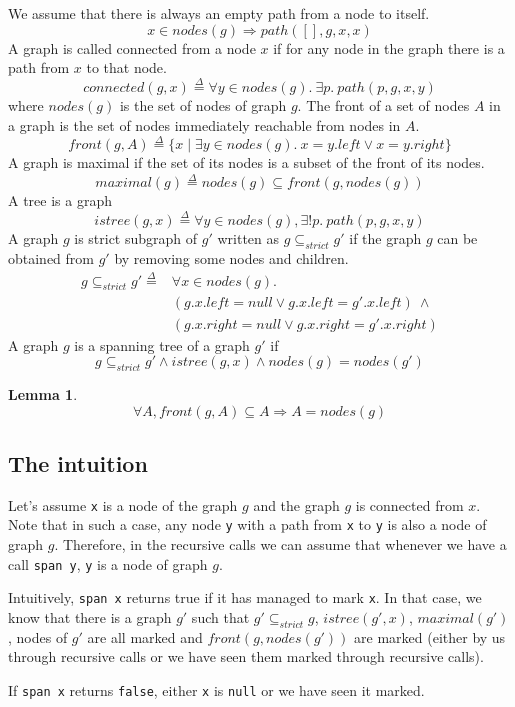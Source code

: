 \documentclass[nocopyrightspace]{sigplanconf}
\newtheorem{lemma}{Lemma}
\def\MyMLe{\lstinline[language=MyML, basicstyle=\small\ttfamily]}
\newcommand{\defeq}{\overset{\Delta}{=}}
\newcommand{\path}{\mathit{path}}
\newcommand{\connected}{\mathit{connected}}
\newcommand{\nodes}{\mathit{nodes}}
\newcommand{\front}{\mathit{front}}
\newcommand{\maximal}{\mathit{maximal}}
\newcommand{\Left}{\mathit{left}}
\newcommand{\Right}{\mathit{right}}
\newcommand{\istree}{\mathit{istree}}
\newcommand{\Null}{\mathit{null}}
\newcommand{\strictSG}{\subseteq_{\mathit{strict}}}
\begin{document}
We assume that there is always an empty path from a node to itself.
\[
x \in \nodes(g) \Rightarrow \path([], g, x, x)
\]
A graph is called connected from a node $x$ if for any node in the graph there is a path from $x$ to that node.
\[
\connected(g, x) \defeq \forall y \in \nodes(g).~ \exists p.~\path(p, g, x, y)
\]
where $\nodes(g)$ is the set of nodes of graph $g$.
The front of a set of nodes $A$ in a graph is the set of nodes immediately reachable from nodes in $A$.
\[
\front(g, A) \defeq \{x \mid \exists y \in \nodes(g).~x = y.\Left \lor x = y.\Right \}
\]
A graph is maximal if the set of its nodes is a subset of the front of its nodes.
\[
\maximal(g) \defeq \nodes(g) \subseteq \front(g, \nodes(g))
\]
A tree is a graph
\[
\istree(g, x) \defeq \forall y \in \nodes(g), \exists! p.~\path(p, g, x, y)
\]
A graph $g$ is strict subgraph of $g'$ written as $g \strictSG g'$
if the graph $g$ can be obtained from $g'$ by removing some nodes and children.
\[
\begin{array}{ll}
g \strictSG g' \defeq & \forall x \in \nodes(g).\\
& (g.x.\Left = \Null \lor g.x.\Left = g'.x.\Left)~\land \\
& (g.x.\Right = \Null \lor g.x.\Right = g'.x.\Right)
\end{array}
\]
A graph $g$ is a spanning tree of a graph $g'$ if
\[
g \strictSG g' \land \istree(g, x) \land \nodes(g) = \nodes(g')
\]
\begin{lemma}\label{lem:in_front_nodes}
\[
\forall A, \front(g, A) \subseteq A \Rightarrow A = \nodes(g)
\]
\end{lemma}
\subsection{The intuition}
Let's assume \MyMLe{x} is a node of the graph $g$ and the graph $g$ is connected from $x$.
Note that in such a case, any node \MyMLe{y} with a path from \MyMLe{x} to \MyMLe{y} is also a node of graph $g$.
Therefore, in the recursive calls we can assume that whenever we have a call \MyMLe{span y}, \MyMLe{y} is a node of graph $g$.

Intuitively, \MyMLe{span x} returns true if it has managed to mark \MyMLe{x}.
In that case, we know that there is a graph $g'$ such that
$g' \strictSG g$, $\istree(g', x)$, $\maximal(g')$, nodes of $g'$ are all marked and $\front(g, \nodes(g'))$ are marked (either by us through recursive calls or we have seen them marked through recursive calls).

If \MyMLe{span x} returns \MyMLe{false}, either \MyMLe{x} is \MyMLe{null} or we have seen it marked.
\end{document}
